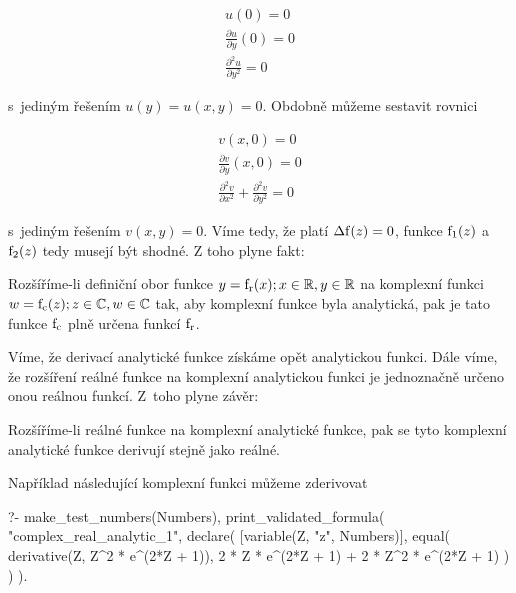 \begin{equation}
\begin{split}
u(0) = 0 \\
\frac{\partial u}{\partial y}(0) = 0 \\
\frac{\partial^2 u}{\partial y^2} = 0
\end{split}
\end{equation}

s~jediným řešením \(u(y) = u(x, y) = 0\). Obdobně můžeme sestavit rovnici

\begin{equation}
\begin{split}
v(x, 0) = 0 \\
\frac{\partial v}{\partial y}(x, 0) = 0 \\
\frac{\partial^2 v}{\partial x^2} + \frac{\partial^2 v}{\partial y^2} = 0
\end{split}
\end{equation}

s~jediným řešením \(v(x, y) = 0\). Víme tedy, že platí \(\mathrm{\Delta f}(z) = 0\), funkce \(\mathrm{f_1}(z)\) a~\(\mathrm{f_2}(z)\) tedy musejí být shodné. Z toho plyne fakt:

\begin{fact}
Rozšíříme-li definiční obor funkce \(y = \mathrm{f_r}(x); x \in \mathbb{R}, y \in \mathbb{R}\) na komplexní funkci \(w = \mathrm{f_c}(z); z \in \mathbb{C}, w \in \mathbb{C}\) tak, aby komplexní funkce byla analytická, pak je tato funkce \(\mathrm{f_c}\) plně určena funkcí \(\mathrm{f_r}\).
\end{fact}

Víme, že derivací analytické funkce získáme opět analytickou funkci. Dále víme, že rozšíření reálné funkce na komplexní analytickou funkci je jednoznačně určeno onou reálnou funkcí. Z~toho plyne závěr:

\begin{fact}
Rozšíříme-li reálné funkce na komplexní analytické funkce, pak se tyto komplexní analytické funkce derivují stejně jako reálné.
\end{fact}

Například následující komplexní funkci můžeme zderivovat 

\begin{prolog}
?-	make_test_numbers(Numbers),
	print_validated_formula(
		"complex_real_analytic_1",
		declare(	[variable(Z, "z", Numbers)],
			equal(
				derivative(Z, Z^2 * e^(2*Z + 1)),
				2 * Z * e^(2*Z + 1) + 2 * Z^2 * e^(2*Z + 1)
			)
		)
	).
\end{prolog}

